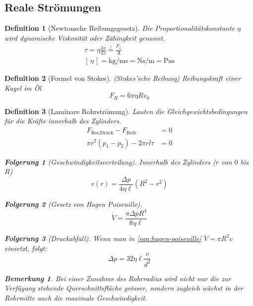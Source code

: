 \documentclass[a4paper, twocolumn]{article}
\numberwithin{equation}{section}
\theoremstyle{hsr-def}
\newtheorem{definition}{Definition}[section]
\theoremstyle{hsr-sub}
\newtheorem{result}{Folgerung}[definition]
\newtheorem{remark}{Bemerkung}[definition]
\newcommand{\dd}[1]{\ensuremath{\mathrm{d}#1}}
\newcommand{\deriv}[2]{\ensuremath{\frac{\dd{#1}}{\dd{#2}}}}
\newcommand{\unitsof}[1]{\ensuremath{\left[\,#1\,\right]}}
\begin{document}
\subsection{Reale Str\"omungen}

\begin{definition}[Newtonsche Reibungsgesetz]
Die Proportionalit\"atskonstante \(\eta\) wird \emph{dynamische Viskosit\"at} oder \emph{Z\"ahingkeit} genannt.
\begin{gather*}
    \tau = \eta \deriv{v}{z}
    \stackrel{!}{=} \frac{F_\parallel}{A}  \\
    \unitsof{\eta}  
    = \si{\kilo\gram\per\metre\second}
    = \si{\newton\second\per\metre}
    = \si{\pascal\second}
\end{gather*}
\end{definition}

\begin{definition}[Formel von Stokes]
(Stokes'sche Reibung) Reibungskraft einer Kugel im \"Ol 
\[
    F_R = 6\pi\eta Rv_0
\]
\end{definition}

\begin{definition}[Laminare Rohrstr\"omung]
Lauten die Gleichgewichtsbedingungen f\"ur die Kr\"afte innerhalb des Zylinders.
\begin{align*}
    F_\text{Res,Druck} - F_\text{Reib} & = 0 \\
    \pi r^2 (p_1 - p_2) - 2\pi rl\tau &= 0
\end{align*}

\begin{result}[Geschwindigkeitsverteilung] 
Innerhalb des Zylinders (\(r\) von \(0\) bis \(R\))
\[
    v(r) = \frac{\Delta p}{4\eta\ell}\left(R^2-r^2\right)
\]
\end{result}

\begin{result}[Gesetz von Hagen Poiseuille]
\begin{equation} \label{eqn:hagen-poiseuille}
    \dot{V} = \frac{\pi\Delta p R^4}{8\eta\ell}
\end{equation}
\end{result}

\begin{result}[Druckabfall]
Wenn man in \eqref{eqn:hagen-poiseuille} \(\dot{V} = \pi R^2 v\) einsetzt, folgt:
\[
    \Delta p = 32\eta\ell \frac{v}{d^2}
\]
\end{result}

\begin{remark}
Bei einer Zunahme des Rohrradius wird nicht nur die zur Verf\"ugung stehende Querschnittsfl\"ache gr\"osser, sondern zugleich w\"achst in der Rohrmitte auch die maximale Geschwindigkeit.
\end{remark}
\end{definition}
\end{document}
